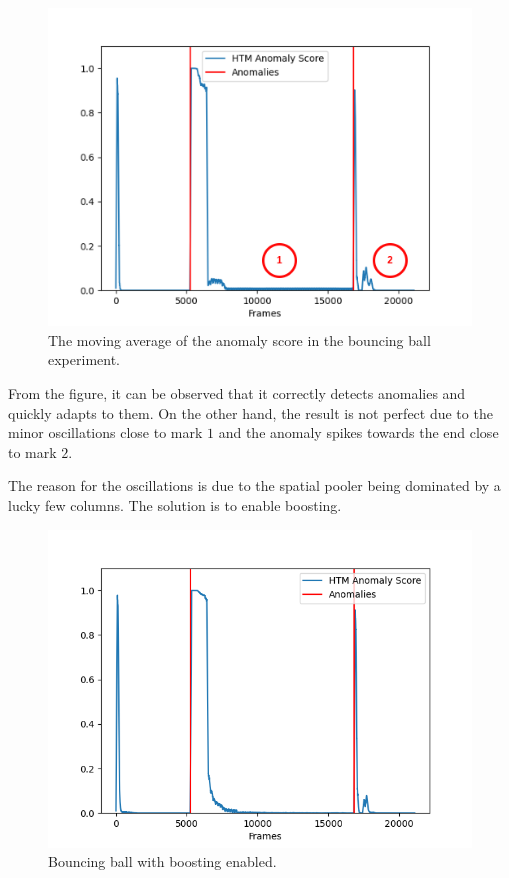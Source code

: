 \begin{figure}[H]
    \centering
    \includegraphics[width=\textwidth]{resources/experiments/bouncing_ball/bb_anoms_bad.png}
    \caption{The moving average of the anomaly score in the bouncing ball experiment.}
\end{figure}
From the figure, it can be observed that it correctly detects anomalies and quickly adapts to them. On the other hand, the result is not perfect due to the minor oscillations close to mark $1$ and the anomaly spikes towards the end close to mark $2$. \par
The reason for the oscillations is due to the spatial pooler being dominated by a lucky few columns. The solution is to enable boosting.\par
\begin{figure}[H]
    \centering
    \includegraphics[width=\textwidth]{resources/experiments/bouncing_ball/bb_anoms_boosting.png}
    \caption{Bouncing ball with boosting enabled.}
\end{figure}
